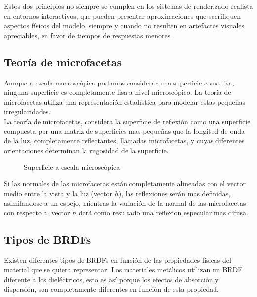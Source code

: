 Estos dos principios no siempre se cumplen en los sistemas de renderizado realista en entornos interactivos, que pueden presentar
aproximaciones que sacrifiquen aspectos f\'isicos del modelo, siempre y cuando no resulten en artefactos visuales apreciables, en
favor de tiempos de respuestas menores.

    \subsection{Teor\'ia de microfacetas}

    \bgroup

        Aunque a escala macrosc\'opica podamos considerar una superficie como lisa, ninguna superficie es completamente lisa a nivel
        microsc\'opico. La teor\'ia de microfacetas utiliza una representaci\'on estad\'istica para modelar estas peque\~nas irregularidades.\\

        La teor\'ia de microfacetas, considera la superficie de reflexi\'on como una superficie compuesta por una matriz de
        superficies mas peque\~nas que la longitud de onda de la luz, completamente reflectantes, llamadas microfacetas, y cuyas
        diferentes orientaciones determinan la rugosidad de la superficie.\\

        \begin{figure}[H]
            \centering
            \caption{Superficie a escala microsc\'opica}
            \vspace{0.5cm}
        \end{figure}

        Si las normales de las microfacetas est\'an completamente alineadas con el vector medio entre la vista y la luz (vector $h$),
        las reflexiones ser\'an mas definidas, asimilandose a un espejo, mientras la variaci\'on de la normal de las microfacetas con
        respecto al vector $h$ dar\'a como resultado una reflexion especular mas difusa.

    \egroup


    \subsection{Tipos de BRDFs}
    Existen diferentes tipos de BRDFs en funci\'on de las propiedades f\'isicas del material que se quiera representar. Los
    materiales met\'alicos utilizan un BRDF diferente a los diel\'ectricos, esto es as\'i porque los efectos de absorci\'on y
    dispersi\'on, son completamente diferentes en funci\'on de esta propiedad.\\

